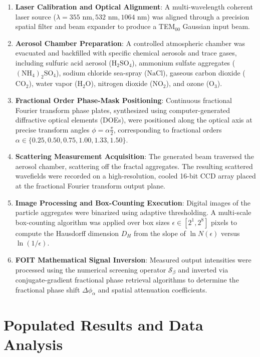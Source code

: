 \documentclass{article}
\begin{document}
\begin{enumerate}
    \item \textbf{Laser Calibration and Optical Alignment}: A multi-wavelength coherent laser source ($\lambda = 355\text{ nm}, 532\text{ nm}, 1064\text{ nm}$) was aligned through a precision spatial filter and beam expander to produce a TEM$_{00}$ Gaussian input beam.
    \item \textbf{Aerosol Chamber Preparation}: A controlled atmospheric chamber was evacuated and backfilled with specific chemical aerosols and trace gases, including sulfuric acid aerosol ($\text{H}_2\text{SO}_4$), ammonium sulfate aggregates ($(\text{NH}_4)_2\text{SO}_4$), sodium chloride sea-spray ($\text{NaCl}$), gaseous carbon dioxide ($\text{CO}_2$), water vapor ($\text{H}_2\text{O}$), nitrogen dioxide ($\text{NO}_2$), and ozone ($\text{O}_3$).
    \item \textbf{Fractional Order Phase-Mask Positioning}: Continuous fractional Fourier transform phase plates, synthesized using computer-generated diffractive optical elements (DOEs), were positioned along the optical axis at precise transform angles $\phi = \alpha \frac{\pi}{2}$, corresponding to fractional orders $\alpha \in \{0.25, 0.50, 0.75, 1.00, 1.33, 1.50\}$.
    \item \textbf{Scattering Measurement Acquisition}: The generated beam traversed the aerosol chamber, scattering off the fractal aggregates. The resulting scattered wavefields were recorded on a high-resolution, cooled 16-bit CCD array placed at the fractional Fourier transform output plane.
    \item \textbf{Image Processing and Box-Counting Execution}: Digital images of the particle aggregates were binarized using adaptive thresholding. A multi-scale box-counting algorithm was applied over box sizes $\epsilon \in [2^1, 2^8]$ pixels to compute the Hausdorff dimension $D_H$ from the slope of $\ln N(\epsilon)$ versus $\ln(1/\epsilon)$.
    \item \textbf{FOIT Mathematical Signal Inversion}: Measured output intensities were processed using the numerical screening operator $\mathcal{S}_{\beta}$ and inverted via conjugate-gradient fractional phase retrieval algorithms to determine the fractional phase shift $\Delta \phi_{\alpha}$ and spatial attenuation coefficients.
\end{enumerate}

\newpage

\section{Populated Results and Data Analysis}
\end{document}
